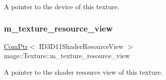 A pointer to the device of this texture. \hypertarget{classmage_1_1_texture_a3de1d2d744e7bb276b0f66d72640e423}{}\label{classmage_1_1_texture_a3de1d2d744e7bb276b0f66d72640e423} 
\subsubsection{\texorpdfstring{m\+\_\+texture\+\_\+resource\+\_\+view}{m\_texture\_resource\_view}}
{\footnotesize\ttfamily \hyperlink{namespacemage_ae74f374780900893caa5555d1031fd79}{Com\+Ptr}$<$ I\+D3\+D11\+Shader\+Resource\+View $>$ mage\+::\+Texture\+::m\+\_\+texture\+\_\+resource\+\_\+view\hspace{0.3cm}{\ttfamily [private]}}

A pointer to the shader resource view of this texture. 